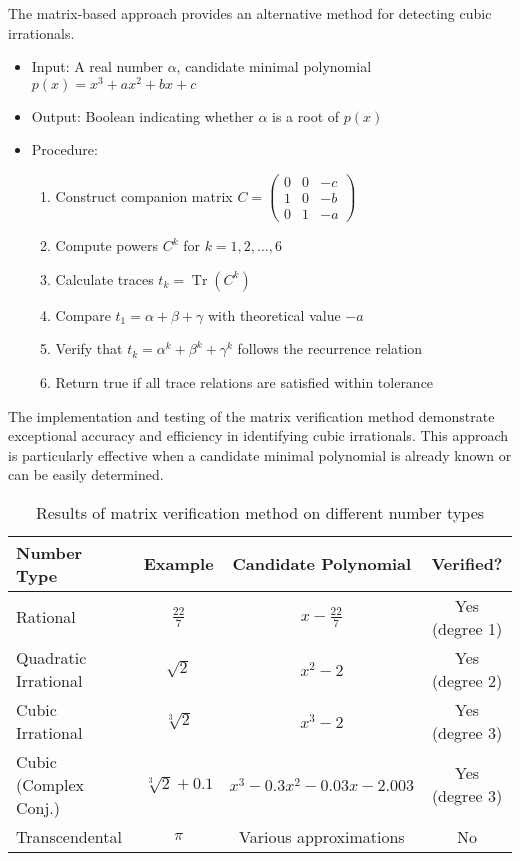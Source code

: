 The matrix-based approach provides an alternative method for detecting cubic irrationals.

\begin{algorithm_def}
\begin{itemize}
\item Input: A real number $\alpha$, candidate minimal polynomial $p(x) = x^3 + ax^2 + bx + c$
\item Output: Boolean indicating whether $\alpha$ is a root of $p(x)$
\item Procedure:
\begin{enumerate}
\item Construct companion matrix $C = \begin{pmatrix} 0 & 0 & -c \\ 1 & 0 & -b \\ 0 & 1 & -a \end{pmatrix}$
\item Compute powers $C^k$ for $k = 1, 2, \ldots, 6$
\item Calculate traces $t_k = \operatorname{Tr}(C^k)$
\item Compare $t_1 = \alpha + \beta + \gamma$ with theoretical value $-a$
\item Verify that $t_k = \alpha^k + \beta^k + \gamma^k$ follows the recurrence relation
\item Return true if all trace relations are satisfied within tolerance
\end{enumerate}
\end{itemize}
\end{algorithm_def}

The implementation and testing of the matrix verification method demonstrate exceptional accuracy and efficiency in identifying cubic irrationals. This approach is particularly effective when a candidate minimal polynomial is already known or can be easily determined.

\begin{table}[htbp]
\centering
\begin{tabular}{|l|c|c|c|}
\hline
\textbf{Number Type} & \textbf{Example} & \textbf{Candidate Polynomial} & \textbf{Verified?} \\
\hline
Rational & $\frac{22}{7}$ & $x - \frac{22}{7}$ & Yes (degree 1) \\
\hline
Quadratic Irrational & $\sqrt{2}$ & $x^2 - 2$ & Yes (degree 2) \\
\hline
Cubic Irrational & $\sqrt[3]{2}$ & $x^3 - 2$ & Yes (degree 3) \\
\hline
Cubic (Complex Conj.) & $\sqrt[3]{2} + 0.1$ & $x^3 - 0.3x^2 - 0.03x - 2.003$ & Yes (degree 3) \\
\hline
Transcendental & $\pi$ & Various approximations & No \\
\hline
\end{tabular}
\caption{Results of matrix verification method on different number types}
\label{tab:numerical_verification_results}
\end{table}

